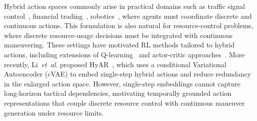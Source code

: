 Hybrid action spaces commonly arise in practical domains such as traffic signal control~\cite{luo2024reinforcement}, financial trading~\cite{pan2022learn}, robotics~\cite{neunert2020continuous, fu2024multiagent}, where agents must coordinate discrete and continuous actions.
This formulation is also natural for resource-control problems, where discrete resource-usage decisions must be integrated with continuous maneuvering.
These settings have motivated RL methods tailored to hybrid actions, including extensions of Q-learning~\cite{masson2016reinforcement, xiong2018parametrized} and actor-critic approaches~\cite{ hausknecht2015deep, fan2019hybrid}.
More recently, Li~\textit{et~al}. proposed HyAR~\cite{li2021hyar}, which uses a conditional Variational Autoencoder (cVAE) to embed single-step hybrid actions and reduce redundancy in the enlarged action space.
However, single-step embeddings cannot capture long-horizon tactical dependencies, motivating temporally grounded action representations that couple discrete resource control with continuous maneuver generation under resource limits.